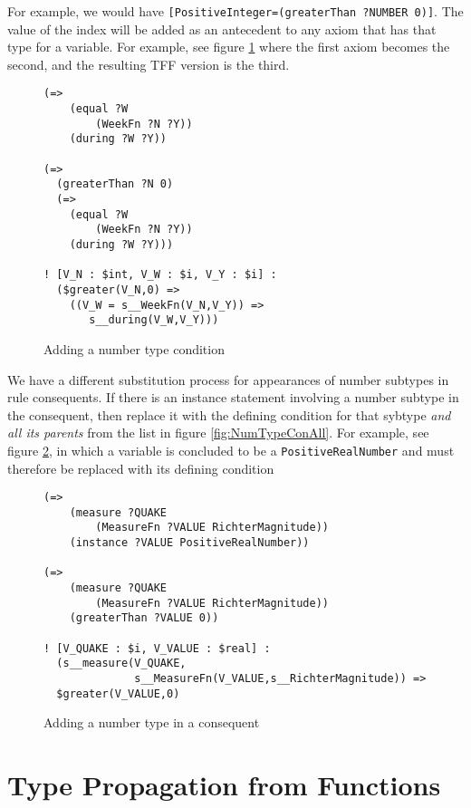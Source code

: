 \documentclass{article}
\begin{document}
For
example, we would have \texttt{[PositiveInteger=(greaterThan ?NUMBER 0)]}.
The value of the index will be added as an antecedent to any axiom that has that
type for a variable.  For example, see figure \ref{fig:NumTypeCon} where the
first axiom becomes the second, and the resulting TFF version is the third.

\begin{figure}[H]
\begin{framed}
\begin{verbatim}
(=>
    (equal ?W
        (WeekFn ?N ?Y))
    (during ?W ?Y))

(=>
  (greaterThan ?N 0)
  (=>
    (equal ?W
        (WeekFn ?N ?Y))
    (during ?W ?Y)))

! [V_N : $int, V_W : $i, V_Y : $i] :
  ($greater(V_N,0) =>
    ((V_W = s__WeekFn(V_N,V_Y)) =>
       s__during(V_W,V_Y)))
\end{verbatim}
\end{framed}
\caption{Adding a number type condition}
\label{fig:NumTypeCon}
\end{figure}

We have a different substitution process for appearances of number subtypes in
rule consequents. If there is an instance statement involving a number subtype
in the consequent, then replace it with the defining condition for that sybtype 
\textit{and all its parents} from the list in
figure \ref{fig:NumTypeConAll}.  For example, see figure \ref{fig:NumTypeConseq},
in which a variable is concluded to be a \texttt{PositiveRealNumber} and must therefore
be replaced with its defining condition

\begin{figure}[H]
\begin{framed}
\begin{verbatim}
(=>
    (measure ?QUAKE
        (MeasureFn ?VALUE RichterMagnitude))
    (instance ?VALUE PositiveRealNumber))

(=>
    (measure ?QUAKE
        (MeasureFn ?VALUE RichterMagnitude))
    (greaterThan ?VALUE 0))

! [V_QUAKE : $i, V_VALUE : $real] : 
  (s__measure(V_QUAKE,
              s__MeasureFn(V_VALUE,s__RichterMagnitude)) =>
  $greater(V_VALUE,0)
\end{verbatim}
\end{framed}
\caption{Adding a number type in a consequent}
\label{fig:NumTypeConseq}
\end{figure}

\section{Type Propagation from Functions}
\end{document}
